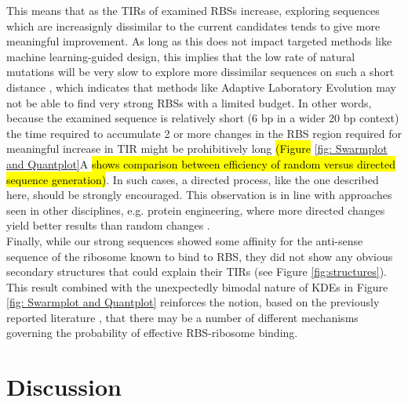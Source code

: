 \documentclass{scrartcl}[2013/05/29]%
\begin{document}
This means that as the TIRs of examined RBSs increase, exploring sequences which are increasignly dissimilar to the current candidates tends to give more meaningful improvement.
As long as this does not impact targeted methods like machine learning-guided design, this implies that the low rate of natural mutations will be very slow to explore more dissimilar sequences on such a short distance \cite{Lee2012}, which indicates that methods like Adaptive Laboratory Evolution may not be able to find very strong RBSs with a limited budget.
In other words, because the examined sequence is relatively short (6 bp in a wider 20 bp context) the time required to accumulate 2 or more changes in the RBS region required for meaningful increase in TIR might be prohibitively long \hl{(Figure} \ref{fig: Swarmplot and Quantplot}A \hl{shows comparison between efficiency of random versus directed sequence generation)}.
In such cases, a directed process, like the one described here, should be strongly encouraged.
This observation is in line with approaches seen in other disciplines, e.g. protein engineering, where more directed changes yield better results than random changes \cite{Jackel2008}.\\

Finally, while our strong sequences showed some affinity for the anti-sense sequence of the ribosome known to bind to RBS, they did not show any obvious secondary structures that could explain their TIRs (see Figure \ref{fig:structures}).
This result combined with the unexpectedly bimodal nature of KDEs in Figure \ref{fig: Swarmplot and Quantplot} reinforces the notion, based on the previously reported literature \cite{Saito2020,EspahBorujeni2016}, that there may be a number of different mechanisms governing the probability of effective RBS-ribosome binding.\\



\section{Discussion}
\end{document}
